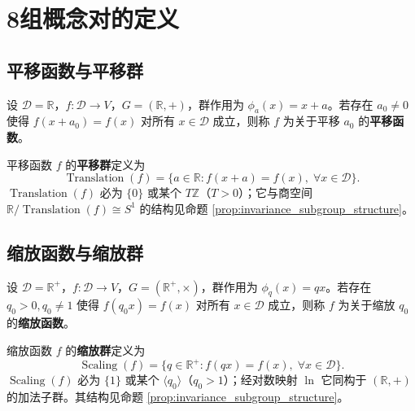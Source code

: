 \section{\texorpdfstring{8组概念对的定义}{8组概念对的定义}}
\label{sec:group_function_basic}

\subsection{\texorpdfstring{平移函数与平移群}{平移函数与平移群}}

\begin{definition}[平移函数]\label{def:translation_function_gf}
设 $\mathcal{D} = \mathbb{R}$，$f: \mathcal{D} \to V$，$G = (\mathbb{R}, +)$，群作用为 $\phi_a(x) = x + a$。若存在 $a_0 \neq 0$ 使得 $f(x + a_0) = f(x)$ 对所有 $x \in \mathcal{D}$ 成立，则称 $f$ 为关于平移 $a_0$ 的\textbf{平移函数}。
\end{definition}

\begin{definition}[平移群]\label{def:translation_group_gf}
平移函数 $f$ 的\textbf{平移群}定义为
\[
\operatorname{Translation}(f) = \{a \in \mathbb{R} : f(x + a) = f(x),\; \forall x \in \mathcal{D}\}.
\]
$\operatorname{Translation}(f)$ 必为 $\{0\}$ 或某个 $T\mathbb{Z}$（$T>0$）；它与商空间 $\mathbb{R}/\operatorname{Translation}(f)\cong S^1$ 的结构见命题 \ref{prop:invariance_subgroup_structure}。
\end{definition}

\subsection{\texorpdfstring{缩放函数与缩放群}{缩放函数与缩放群}}

\begin{definition}[缩放函数]\label{def:scaling_function_gf}
设 $\mathcal{D} = \mathbb{R}^+$，$f: \mathcal{D} \to V$，$G = (\mathbb{R}^+, \times)$，群作用为 $\phi_q(x) = qx$。若存在 $q_0 > 0, q_0 \neq 1$ 使得 $f(q_0 x) = f(x)$ 对所有 $x \in \mathcal{D}$ 成立，则称 $f$ 为关于缩放 $q_0$ 的\textbf{缩放函数}。
\end{definition}

\begin{definition}[缩放群]\label{def:scaling_group_gf}
缩放函数 $f$ 的\textbf{缩放群}定义为
\[
\operatorname{Scaling}(f) = \{q \in \mathbb{R}^+ : f(qx) = f(x),\; \forall x \in \mathcal{D}\}.
\]
$\operatorname{Scaling}(f)$ 必为 $\{1\}$ 或某个 $\langle q_0\rangle$（$q_0>1$）；经对数映射 $\ln$ 它同构于 $(\mathbb{R},+)$ 的加法子群。其结构见命题 \ref{prop:invariance_subgroup_structure}。
\end{definition}

